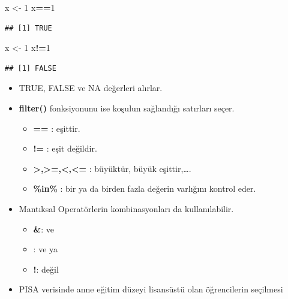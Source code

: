 \documentclass[
  oneside]{book}
\newenvironment{Shaded}{\begin{snugshade}}{\end{snugshade}}
\newcommand{\DecValTok}[1]{\textcolor[rgb]{0.00,0.00,0.81}{#1}}
\newcommand{\NormalTok}[1]{#1}
\newcommand{\OtherTok}[1]{\textcolor[rgb]{0.56,0.35,0.01}{#1}}
\newcommand{\SpecialCharTok}[1]{\textcolor[rgb]{0.81,0.36,0.00}{\textbf{#1}}}
\providecommand{\tightlist}{%
  \setlength{\itemsep}{0pt}\setlength{\parskip}{0pt}}
\begin{document}
\begin{Shaded}
\begin{Highlighting}[]
\NormalTok{x }\OtherTok{\textless{}{-}} \DecValTok{1}
\NormalTok{x}\SpecialCharTok{==}\DecValTok{1}
\end{Highlighting}
\end{Shaded}

\begin{verbatim}
## [1] TRUE
\end{verbatim}

\begin{Shaded}
\begin{Highlighting}[]
\NormalTok{x }\OtherTok{\textless{}{-}} \DecValTok{1}
\NormalTok{x}\SpecialCharTok{!=}\DecValTok{1}
\end{Highlighting}
\end{Shaded}

\begin{verbatim}
## [1] FALSE
\end{verbatim}

\begin{itemize}
\item
  TRUE, FALSE ve NA değerleri alırlar.
\item
  \textbf{filter()} fonksiyonunu ise koşulun sağlandığı satırları seçer.

  \begin{itemize}
  \tightlist
  \item
    \textbf{==} : eşittir.
  \item
    \textbf{!= } : eşit değildir.
  \item
    \textbf{\textgreater,\textgreater=,\textless,\textless= } : büyüktür, büyük eşittir,\ldots.
  \item
    \textbf{\%in\%} : bir ya da birden fazla değerin varlığını kontrol eder.
  \end{itemize}
\item
  Mantıksal Operatörlerin kombinasyonları da kullanılabilir.

  \begin{itemize}
  \tightlist
  \item
    \textbf{\&}: ve
  \item
    \textbf{\textbar{}}: ve ya
  \item
    \textbf{!}: değil
  \end{itemize}
\item
  PISA verisinde anne eğitim düzeyi lisansüstü olan öğrencilerin seçilmesi
\end{itemize}
\end{document}
